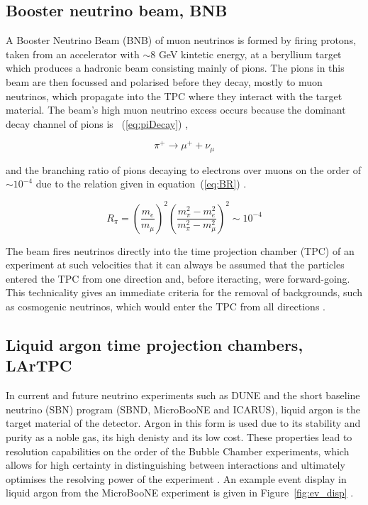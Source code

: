 \subsection{Booster neutrino beam, BNB}

A Booster Neutrino Beam (BNB) of muon neutrinos is formed by firing protons, taken from an accelerator with $\sim$8 GeV kintetic energy, at a beryllium target which produces a hadronic beam consisting mainly of pions. The pions in this beam are then focussed and polarised before they decay, mostly to muon neutrinos, which propagate into the TPC where they interact with the target material. The beam's high muon neutrino excess occurs because the dominant decay channel of pions is ~(\ref{eq:piDecay}) \cite{sbn},

\begin{equation}\label{eq:piDecay}
    \pi ^{ + } \longrightarrow \mu ^{ + } + \nu _{ \mu } 
\end{equation}
    
    and the branching ratio of pions decaying to electrons over muons on the order of $\sim 10 ^{ -4 }$ due to the relation given in equation~(\ref{eq:BR}) \cite{BR}.

\begin{equation}\label{eq:BR}
    R_{ \pi } = \left( \dfrac{ m_{ e } }{ m_{ \mu } } \right) ^{2} \left( \dfrac{ m_{ \pi }^{ 2 } - m_{ e } ^{ 2 } }{ m_{ \pi } ^{ 2 } - m_{ \mu } ^{ 2 } } \right) ^{ 2 } \sim 10^{-4}
\end{equation}

The beam fires neutrinos directly into the time projection chamber (TPC) of an experiment at such velocities that it can always be assumed that the particles entered the TPC from one direction and, before iteracting, were forward-going. This technicality gives an immediate criteria for the removal of backgrounds, such as cosmogenic neutrinos, which would enter the TPC from all directions \cite{sbn}.

    
\subsection{Liquid argon time projection chambers, LArTPC}     
    
    In current and future neutrino experiments such as DUNE and the short baseline neutrino (SBN) program (SBND, MicroBooNE and ICARUS), liquid argon is the target material of the detector. Argon in this form is used due to its stability and purity as a noble gas, its high denisty and its low cost. These properties lead to resolution capabilities on the order of the Bubble Chamber experiments, which allows for high certainty in distinguishing between interactions and ultimately optimises the resolving power of the experiment \cite{larRes}. An example event display in liquid argon from the MicroBooNE experiment is given in Figure~\ref{fig:ev_disp} \cite{evDisp}.

